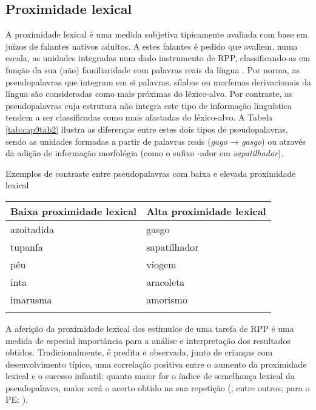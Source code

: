 \documentclass[output=paper,colorlinks,citecolor=brown,booklanguage=portuguese]{langscibook}
\begin{document}
\subsection{Proximidade lexical}\label{subsec:in_third_section}
A proximidade lexical é uma medida subjetiva tipicamente avaliada com base em juízos de falantes nativos adultos. A estes falantes é pedido que avaliem, numa escala, as unidades integradas num dado instrumento de RPP, classificando-as em função da sua (não) familiaridade com palavras reais da língua \citep{Ribeiro2011}. Por norma, as pseudopalavras que integram em si palavras, sílabas ou morfemas derivacionais da língua são consideradas como mais próximas do léxico-alvo. Por contraste, as pseudopalavras cuja estrutura não integra este tipo de informação linguística tendem a ser classificadas como mais afastadas do léxico-alvo. A Tabela \ref{tab:cap9tab2} ilustra as diferenças entre estes dois tipos de pseudopalavras, sendo as unidades formadas a partir de palavras reais (\emph{gago} → \emph{gasgo}) ou através da adição de informação morfológia (como o sufixo -ador em \emph{sapatilhador}).



\begin{Tabela}
\caption{Exemplos de contraste entre pseudopalavras com baixa e elevada proximidade lexical \citep[apêndice K]{Ribeiro2011}}
\label{tab:cap9tab2}


\begin{tabularx}{.8\textwidth}{Xl}
\lsptoprule
Baixa proximidade lexical & Alta proximidade lexical\\
\midrule
azoitadida & gasgo\\
tupanfa & sapatilhador\\
péu & viogem\\
inta & aracoleta\\
imarusma & amorismo\\
\lspbottomrule
\end{tabularx}
\end{Tabela}


A aferição da proximidade lexical dos estímulos de uma tarefa de RPP é uma medida de especial importância para a análise e interpretação dos resultados obtidos. Tradicionalmente, é predita e observada, junto de crianças com desenvolvimento típico, uma correlação positiva entre o aumento da proximidade lexical e o sucesso infantil: quanto maior for o índice de semelhança lexical da pseudopalavra, maior será o acerto obtido na sua repetição (\citealp{Archibald2006, Casalini2007, Dispaldro2013}; entre outros; para o PE: \citealp{Ribeiro2011}).
\end{document}
